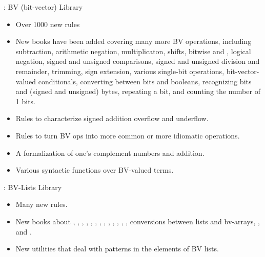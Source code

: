 
\begin{frame}

\implibtitle

: BV (bit-vector) Library

\begin{itemize}

\item Over 1000 new rules

\item New books have been added covering many more BV operations,
including subtraction, arithmetic negation, multiplicaton, shifts,
bitwise  and , logical negation, signed and
unsigned comparisons, signed and unsigned division and remainder,
trimming, sign extension, various single-bit operations,
bit-vector-valued conditionals, converting between bits and booleans,
recognizing bits and (signed and unsigned) bytes, repeating a bit, and
counting the number of 1 bits.

\item Rules to characterize signed addition overflow and underflow.

\item Rules to turn BV ops into more common or more idiomatic operations.

\item A formalization of one's complement numbers and addition.

\item Various syntactic functions over BV-valued terms.

\end{itemize}

\end{frame}


\begin{frame}

\implibtitle

: BV-Lists Library

\begin{itemize}

\item Many new rules.

\item New books about , ,
, ,
, , ,
, , ,
, , ,
conversions between lists and bv-arrays, , and
.

\item New utilities that deal with patterns in the elements of BV lists.

\end{itemize}

\end{frame}

